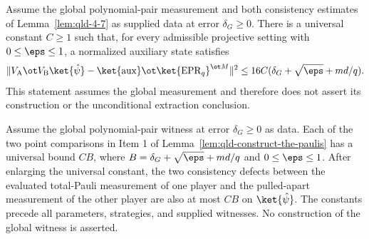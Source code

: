 \begin{example}
	\label{lem:qld-state-extraction-given-global-pair}
	\leanok
	Assume the global polynomial-pair measurement and both consistency estimates
	of Lemma~\ref{lem:qld-4-7} as supplied data at error $\delta_G\geq0$.
	There is a universal constant $C\geq1$ such that, for every admissible
	projective setting with $0\leq\eps\leq1$, a normalized auxiliary state satisfies
	\[
	  \|V_{\mathrm A}\ot V_{\mathrm B}\ket{\hat\psi}
	      -\ket{\mathrm{aux}}\ot\ket{\mathrm{EPR}_q}^{\ot M}\|^2
	  \leq16C(\delta_G+\sqrt\eps+md/q).
	\]
	This statement assumes the global measurement and therefore does not assert
	its construction or the unconditional extraction conclusion.
\end{example}

\begin{example}
  \label{lem:qld-evaluated-pauli-given-global-pair}
  \leanok
  Assume the global polynomial-pair witness at error $\delta_G\geq0$ as data.
  Each of the two point comparisons in Item 1 of
  Lemma~\ref{lem:qld-construct-the-paulis} has a universal bound $CB$, where
  $B=\delta_G+\sqrt\eps+md/q$ and $0\leq\eps\leq1$.
  After enlarging the universal constant, the two consistency defects between
  the evaluated total-Pauli measurement of one player and the pulled-apart
  measurement of the other player are also at most $CB$ on $\ket{\hat\psi}$.
  The constants precede all parameters, strategies, and supplied witnesses.
  No construction of the global witness is asserted.
\end{example}

